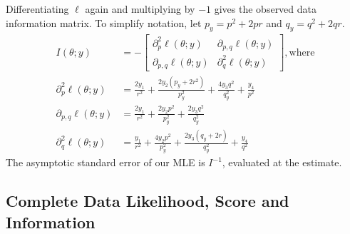 \documentclass[11pt, oneside]{article}   	%
\begin{document}
\begin{appendices}
    Differentiating $\ell$ again and multiplying by $-1$ gives the observed data information matrix. To simplify notation, let $p_y = p^2 + 2pr$ and $q_y = q^2 + 2qr$.
    \begin{align}
        I(\theta;y) &= - \begin{bmatrix}
            \partial^2_p \ell(\theta; y) & \partial_{p,q} \ell(\theta; y)\\
            \partial_{p,q} \ell(\theta; y) & \partial^2_q \ell(\theta; y)
        \end{bmatrix} \mathrm{, where}\\
        \partial^2_p \ell(\theta; y) &=  \frac{2y_1}{r^2} + \frac{2 y_2 (p_y + 2r^2)}{p_y^2} + \frac{4 y_3 q^2}{q_y^2} + \frac{y_4}{p^2}\\
        \partial_{p,q} \ell(\theta; y) &=  \frac{2y_1}{r^2} + \frac{2 y_2 p^2}{p_y^2} + \frac{2 y_3 q^2}{q_y^2}\\
        \partial^2_q \ell(\theta; y) &=  \frac{y_1}{r^2} + \frac{4 y_2 p^2}{p_y^2} + \frac{2 y_3 (q_y + 2r)}{q_y^2} + \frac{y_4}{q^2}
    \end{align}
    The asymptotic standard error of our MLE is $I^{-1}$, evaluated at the estimate.

    \subsection{Complete Data Likelihood, Score and Information}
    \label{app:blood_complete}


\end{appendices}
\end{document}
